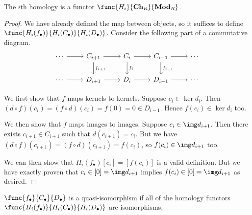 \begin{proposition}
    The \(i\)th homology is a functor \(\func{H_i}{\textbf{Ch}_R}{\textbf{Mod}_R}\).
\end{proposition}
\begin{proof}
    We have already defined the map between objects,
    so it suffices to define \(\func{H_i(f_\bullet)}{H_i(C_\bullet)}{H_i(D_\bullet)}\).
    Consider the following part of a commutative diagram.
    \begin{equation*}
        \begin{tikzcd}
            \cdots \arrow{r} & C_{i+1} \arrow{r} \arrow{d}{f_{i+1}} &
            C_i \arrow{r} \arrow{d}{f_i} & C_{i-1} \arrow{r} \arrow{d}{f_{i-1}} & \cdots \\
            \cdots \arrow{r} & D_{i+1} \arrow{r} & D_i \arrow{r} & D_{i-1} \arrow{r} & \cdots
        \end{tikzcd}
    \end{equation*}

    We first show that \(f\) maps kernels to kernels.
    Suppose \(c_i \in \ker d_i\).
    Then \((d \circ f)(c_i) = (f \circ d)(c_i) = f(0) = 0 \in D_{i-1}\).
    Hence \(f(c_i) \in \ker d_i\) too.

    We then show that \(f\) maps images to images.
    Suppose \(c_i \in \img d_{i+1}\).
    Then there exists \(c_{i+1} \in C_{i+1}\) such that \(d(c_{i+1}) = c_i\).
    But we have \((d \circ f)(c_{i+1}) = (f \circ d)(c_{i+1}) = f(c_i)\),
    so \(f(c_i) \in \img d_{i+1}\) too.

    We can then show that \(H_i(f_\bullet)[c_i] = [f(c_i)]\) is a valid definition.
    But we have exactly proven that \(c_i \in [0] = \img d_{i+1}\)
    implies \(f(c_i) \in [0] = \img d_{i+1}\) as desired.
\end{proof}
\begin{definition}
    \(\func{f_\bullet}{C_\bullet}{D_\bullet}\) is a quasi-isomorphism
    if all of the homology functors \(\func{H_i(f_\bullet)}{H_i(C_\bullet)}{H_i(D_\bullet)}\) are isomorphisms.
\end{definition}

